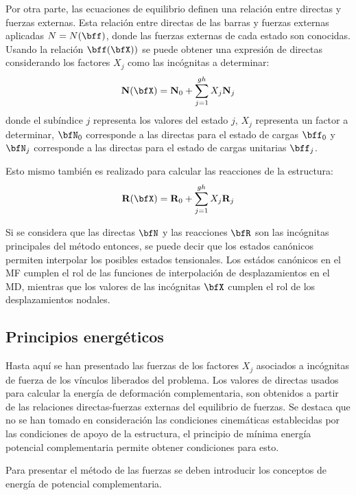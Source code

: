 Por otra parte, las ecuaciones de equilibrio definen una relación entre directas y fuerzas externas. %
Esta relación entre directas de las barras y fuerzas externas aplicadas $N=N(\bff)$, donde las fuerzas externas de cada estado son conocidas. %
%
Usando la relación $\bff(\bfX))$ se puede obtener una expresión de directas considerando los factores $X_j$ como las incógnitas a determinar:
%
\begin{equation}\label{eqn:estadosdirectas}
\textbf{N}(\bfX) = \textbf{N}_0 + \sum_{j=1}^{gh} X_j \textbf{N}_j
\end{equation}
%
donde el subíndice $j$ representa los valores del estado $j$, $X_j$ representa un factor a determinar, $\bfN_0$ corresponde a las directas para el estado de cargas $\bff_0$ y $\bfN_j$ corresponde a las directas para el estado de cargas unitarias $\bff_j$.
%


Esto mismo también es realizado para calcular las reacciones de la estructura:
%
\begin{equation}
\textbf{R}(\bfX) = \textbf{R}_0 + \sum_{j=1}^{gh} X_j \textbf{R}_j
\end{equation}

Si se considera que las directas $\bfN$ y las reacciones $\bfR$ son las incógnitas principales del método entonces, se puede decir que los estados canónicos permiten interpolar los posibles estados tensionales. Los estádos canónicos en el MF cumplen el rol de las funciones de interpolación de desplazamientos en el MD, mientras que los valores de las incógnitas $\bfX$ cumplen el rol de los desplazamientos nodales.

\subsection{Principios energéticos}

Hasta aquí se han presentado las fuerzas de los factores $X_j$ asociados a incógnitas de fuerza de los vínculos liberados del problema. %
%
Los valores de directas usados para calcular la energía de deformación complementaria, son obtenidos a partir de las relaciones directas-fuerzas externas del equilibrio de fuerzas. %
%
Se destaca que no se han tomado en consideración las condiciones cinemáticas establecidas por las condiciones de apoyo de la estructura, el principio de mínima energía potencial complementaria permite obtener condiciones para esto.


Para presentar el método de las fuerzas se deben introducir los conceptos de energía de potencial complementaria. %

